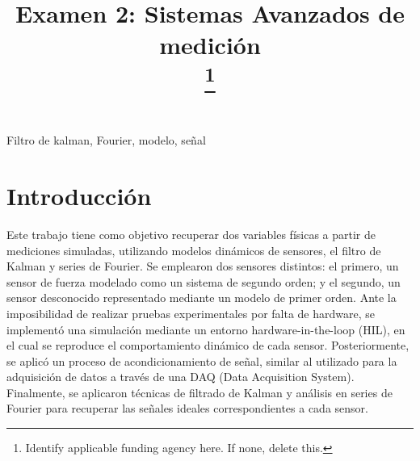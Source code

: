 \documentclass[conference]{IEEEtran}
\begin{document}
\title{Examen 2: Sistemas Avanzados de medici\'on\\
	\thanks{Identify applicable funding agency here. If none, delete this.}
}

\author{
	\and

}

\maketitle

\begin{IEEEkeywords}
	Filtro de kalman, Fourier, modelo, se\~nal
\end{IEEEkeywords}

\section{Introducción}

Este trabajo tiene como objetivo recuperar dos variables físicas a partir de mediciones simuladas, utilizando modelos dinámicos de sensores, el filtro de Kalman y series de Fourier. Se emplearon dos sensores distintos: el primero, un sensor de fuerza modelado como un sistema de segundo orden; y el segundo, un sensor desconocido representado mediante un modelo de primer orden. Ante la imposibilidad de realizar pruebas experimentales por falta de hardware, se implementó una simulación mediante un entorno hardware-in-the-loop (HIL), en el cual se reproduce el comportamiento dinámico de cada sensor. Posteriormente, se aplicó un proceso de acondicionamiento de señal, similar al utilizado para la adquisición de datos a través de una DAQ (Data Acquisition System). Finalmente, se aplicaron técnicas de filtrado de Kalman y análisis en series de Fourier para recuperar las señales ideales correspondientes a cada sensor.
\end{document}
